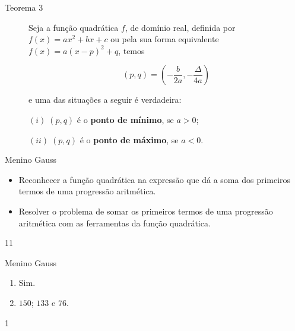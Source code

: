 \begin{description}
\item[Teorema 3]

Seja a função quadrática \(f\), de domínio real, definida por  \(f(x)=ax^2+bx+c\) ou pela sua forma equivalente \(f(x)=a(x-p)^2+q\), temos 

$$(p,q)= \left( -\frac{b}{2a}, -\frac{\Delta}{4a} \right)$$

e uma das situações a seguir é verdadeira:

\((i)\;(p,q)\) é o \textbf{ponto de mínimo}, se \(a>0\);

\((ii)\;(p,q)\) é o \textbf{ponto de máximo}, se \(a<0\).
\end{description}

\clearpage
\def\currentcolor{session3}
\marginpar{\vspace{.5em}}
\begin{objectives}{Menino Gauss}
{
  \begin{itemize}
  \item Reconhecer a função quadrática na expressão que dá a soma dos primeiros termos de uma progressão aritmética.
  \item Resolver o problema de somar os primeiros termos de uma progressão aritmética com as ferramentas da função quadrática.
  \end{itemize}
}{1}{1}
\end{objectives}
\begin{answer}{Menino Gauss}
{
\begin{enumerate}
\item {} 
Sim.

\item {} 
\(150\); \(133\) e \(76\).
\end{enumerate}
}{1}
\end{answer}
\clearmargin
\marginpar{\vspace{.5em}}
